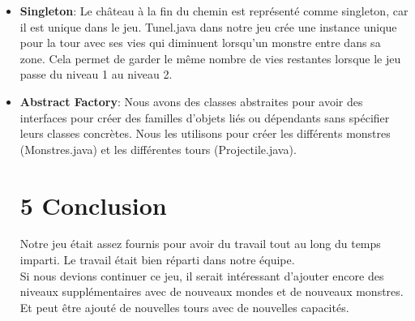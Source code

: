 \documentclass{report}
\begin{document}
\begin{itemize}
	\item \textbf{Singleton}: Le château à la fin du chemin est représenté comme singleton, car il est unique dans le jeu.
Tunel.java dans notre jeu crée une instance unique pour la tour avec ses vies qui diminuent lorsqu’un monstre entre dans sa zone.
Cela permet de garder le même nombre de vies restantes lorsque le jeu passe du niveau 1 au niveau 2.
	\item \textbf{Abstract Factory}: Nous avons des classes abstraites pour avoir des interfaces pour créer des familles d'objets liés ou dépendants sans spécifier leurs classes concrètes. Nous les utilisons pour créer les différents monstres (Monstres.java) et les différentes tours (Projectile.java).
	
\section*{5 Conclusion}

Notre jeu était assez fournis pour avoir du travail tout au long du temps imparti. Le travail était bien réparti dans notre équipe.\\
Si nous devions continuer ce jeu, il serait intéressant d'ajouter encore des niveaux supplémentaires avec de nouveaux mondes et de nouveaux monstres. Et peut être ajouté de nouvelles tours avec de nouvelles capacités.

\end{itemize}
\end{document}
